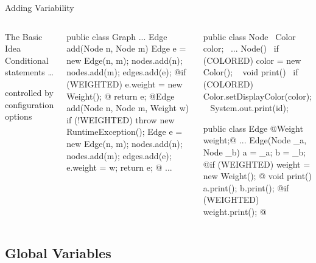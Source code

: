 \begin{frame}[fragile]{Adding Variability}
		\begin{columns}
				\begin{definition}{The Basic Idea}
					Conditional statements \ldots

					controlled by configuration options
				\end{definition}
\begin{tiny}
\begin{codetight}{}
public class Graph {
	...
	Edge add(Node n, Node m) {
		Edge e = new Edge(n, m);
		nodes.add(n); nodes.add(m); edges.add(e);
		@if (WEIGHTED) { e.weight = new Weight(); }@
		return e;
	}
	@Edge add(Node n, Node m, Weight w) {
		if (!WEIGHTED) { throw new RuntimeException(); }
		Edge e = new Edge(n, m);
		nodes.add(n); nodes.add(m); edges.add(e);
		e.weight = w;
		return e;
	}@
	...
}
\end{codetight}
\end{tiny}	
\begin{tiny}
\begin{codetight}{}
public class Node {
	~Color color;~
	...
	Node(){
		~if (COLORED) { color = new Color(); }~
	}
	void print() {
		~if (COLORED) { Color.setDisplayColor(color); }~
		System.out.print(id);
	}
}
\end{codetight}
\begin{codetight}{}
public class Edge {
	@Weight weight;@ 
	...
	Edge(Node _a, Node _b) {
		a = _a; b = _b;
		@if (WEIGHTED) { weight = new Weight(); }@
	}
	void print() {
		a.print(); b.print();
		@if (WEIGHTED) { weight.print(); }@
	}
}
\end{codetight}
\end{tiny}	
		\end{columns}
\end{frame}

\subsection{Global Variables}

